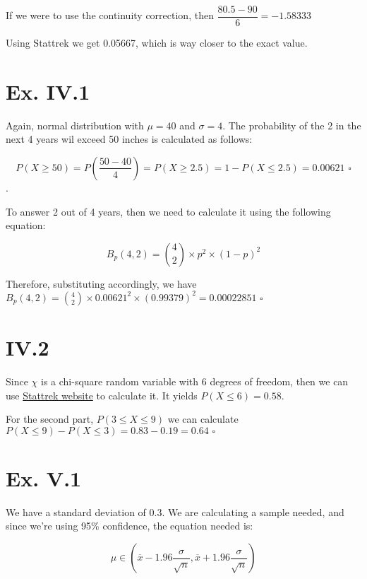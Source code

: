\documentclass[titlepage, letterpaper]{article}
\newcommand{\qed}{\,\,\square}
\begin{document}
If we were to use the continuity correction, then $\dfrac{80.5 - 90}{6} = -1.58333$

Using Stattrek we get 0.05667, which is way closer to the exact value.

\section{Ex. IV.1} %
\label{sec:ex_iv_1}

Again, normal distribution with $\mu = 40$ and $\sigma = 4$.
The probability of the 2 in the next 4 years wil exceed 50 inches is calculated as follows:

$$P(X \geq 50) = P\left(\dfrac{50-40}{4}\right) = P(X \geq 2.5) = 1 - P(X \leq 2.5) = 0.00621 \qed$$.

To answer 2 out of 4 years, then we need to calculate it using the following equation:

\begin{equation}
    B_p(4,2) = \binom{4}{2} \times p^2 \times (1-p)^2
\end{equation}

Therefore, substituting accordingly, we have $B_p(4,2) = \binom{4}{2} \times 0.00621^2 \times (0.99379)^2 = 0.00022851 \qed$

\section{IV.2} %
\label{sec:iv_2}

Since $\chi$ is a chi-square random variable with 6 degrees of freedom, then we can use \href{http://stattrek.com/online-calculator/chi-square.aspx}{Stattrek website} to calculate it.
It yields $P(X \leq 6) = 0.58$.

For the second part, $P(3 \leq X \leq 9)$ we can calculate $P(X \leq 9) - P(X \leq 3) = 0.83 - 0.19 = 0.64\qed$


\section{Ex. V.1} %
\label{sec:ex_v_1}

We have a standard deviation of 0.3.
We are calculating a sample needed, and since we're using 95\% confidence, the equation needed is:

\begin{equation}
    \mu \in \left(\overline{x} - 1.96\frac{\sigma}{\sqrt{n}}, \overline{x} + 1.96\frac{\sigma}{\sqrt{n}} \right)
\end{equation}
\end{document}
